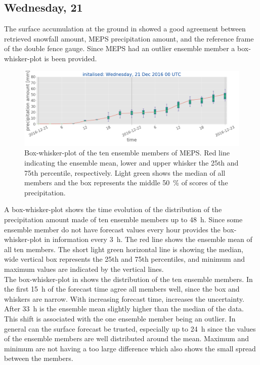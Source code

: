 \subsection{Wednesday, \SI{21}{\dec}}\label{sec:2112:surface}
The surface accumulation at the ground in  showed a good agreement between retrieved snowfall amount, MEPS precipitation amount, and the reference frame of the double fence gauge. Since MEPS had an outlier ensemble member a box-whisker-plot is been provided. 
\begin{figure}[t]
	\includegraphics[width=\textwidth]{./fig_boxplot_sfc/20161221_0}
	\caption{Box-whisker-plot of the ten ensemble members of MEPS. Red line indicating the ensemble mean, lower and upper whisker the 25th and 75th percentile, respectively. Light green shows the median of all members and the box represents the middle \SI{50}{\percent} of scores of the precipitation.}\label{fig:boxplt21}
\end{figure}
A box-whisker-plot shows the time evolution of the distribution of the precipitation amount made of ten ensemble members up to \SI{48}{\hour}. Since some ensemble member do not have forecast values every hour provides the box-whisker-plot in  information every \SI{3}{\hour}. The red line shows the ensemble mean of all ten members. The short light green horizontal line is showing the median, wide vertical box represents the 25th and 75th percentiles, and minimum and maximum values are indicated by the vertical lines.
\\
The box-whisker-plot in  shows the distribution of the ten ensemble members. In the first \SI{15}{\hour} of the forecast time agree all members well, since the box and whiskers are narrow. With increasing forecast time, increases the uncertainty. After \SI{33}{\hour} is the ensemble mean slightly higher than the median of the data. This shift is associated with the one ensemble member being an outlier.
In general can the surface forecast be trusted, especially up to \SI{24}{\hour} since the values of the ensemble members are well distributed around the mean. Maximum and minimum are not having a too large difference which also shows the small spread between the members.

